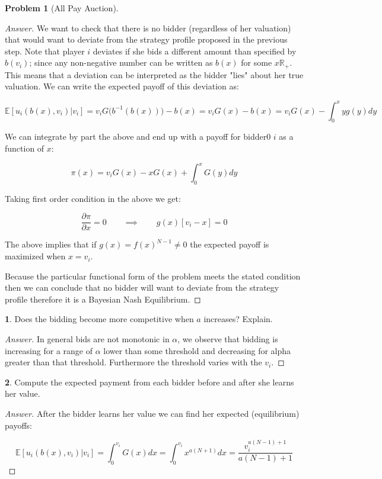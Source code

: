 \documentclass[12pt]{article}
\theoremstyle{definition}
\newtheorem{problem}{Problem}
\newtheorem{subproblem}{}[problem]
\newcommand{\qiq}{\qquad \implies \qquad}
\begin{document}
\begin{problem}[All Pay Auction]
\begin{proof}[Answer]
We want to check that there is no bidder (regardless of her valuation) that would want to deviate from the strategy profile proposed in the previous step. Note that player $i$ deviates if she bids a different amount than specified by $b(v_i)$; since any non-negative number can be written as $b(x)$ for some $x\mathbb{R}_+$. This means that a deviation can be interpreted as the bidder "lies" about her true valuation. We can write the expected payoff of this deviation as:

$$\mathbb{E}[u_i(b(x),v_i)|v_i]=v_i G\Big(b^{-1}(b(x))\Big)- b(x) = v_i G(x)- b(x) = v_i G(x)- \int_0^{x}yg(y)dy  $$

We can integrate by part the above and end up with a payoff for bidder0 $i$ as a function of $x$:

$$\pi(x) =  v_i G(x)- xG(x)+\int_0^{x}G(y)dy$$

Taking first order condition in the above we get:

$$\frac{\partial \pi}{\partial x} = 0 \qiq g(x)[v_i-x] = 0$$

The above implies that if $g(x)=f(x)^{N-1}\neq 0$ the expected payoff is maximized when $x = v_i $. 

Because the particular functional form of the problem meets the stated condition then we can conclude that no bidder will want to deviate from the strategy profile therefore it is a Bayesian Nash Equilibrium.

\end{proof}
\begin{subproblem}
Does the bidding become more competitive when $a$ increases? Explain.
\end{subproblem}
\begin{proof}[Answer]
In general bids are not monotonic in $\alpha$, we observe that bidding is increasing for a range of $\alpha$ lower than some threshold and decreasing for alpha greater than that threshold. Furthermore the threshold varies with the $v_i$.
\end{proof}
\begin{subproblem}
Compute the expected payment from each bidder before and after she learns her
 value.
 \end{subproblem}
\begin{proof}[Answer]

After the bidder learns her value we can find her expected (equilibrium) payoffs:

$$\mathbb{E}[u_i(b(x),v_i)|v_i]=\int_0^{v_i}G(x)dx =\int_0^{v_i}x^{a(N+1)}dx = \frac{v_i^{a (N-1)+1}}{a (N-1)+1}$$


\end{proof}
\end{problem}
\end{document}
